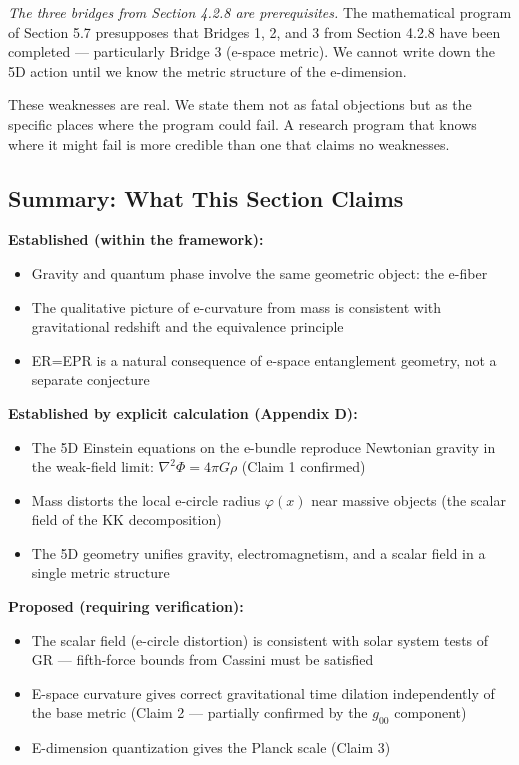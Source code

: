 \documentclass[aps,prd,preprint,superscriptaddress,longbibliography,floatfix]{revtex4-2}
\theoremstyle{remark}
\begin{document}
\textit{The three bridges from Section 4.2.8 are prerequisites.} The mathematical program of Section 5.7 presupposes that Bridges 1, 2, and 3 from Section 4.2.8 have been completed --- particularly Bridge 3 (e-space metric). We cannot write down the 5D action until we know the metric structure of the e-dimension.

These weaknesses are real. We state them not as fatal objections but as the specific places where the program could fail. A research program that knows where it might fail is more credible than one that claims no weaknesses.



\subsection{Summary: What This Section Claims}

\textbf{Established (within the framework):}

\begin{itemize}
  \item Gravity and quantum phase involve the same geometric object: the e-fiber
  \item The qualitative picture of e-curvature from mass is consistent with gravitational redshift and the equivalence principle
  \item ER=EPR is a natural consequence of e-space entanglement geometry, not a separate conjecture
\end{itemize}

\textbf{Established by explicit calculation (Appendix D):}

\begin{itemize}
  \item The 5D Einstein equations on the e-bundle reproduce Newtonian gravity in the weak-field limit: $\nabla^{2}\Phi = 4\pi G\rho$ (Claim 1 confirmed)
  \item Mass distorts the local e-circle radius $\varphi(x)$ near massive objects (the scalar field of the KK decomposition)
  \item The 5D geometry unifies gravity, electromagnetism, and a scalar field in a single metric structure
\end{itemize}

\textbf{Proposed (requiring verification):}

\begin{itemize}
  \item The scalar field (e-circle distortion) is consistent with solar system tests of GR --- fifth-force bounds from Cassini must be satisfied
  \item E-space curvature gives correct gravitational time dilation independently of the base metric (Claim 2 --- partially confirmed by the $g_{00}$ component)
  \item E-dimension quantization gives the Planck scale (Claim 3)
\end{itemize}
\end{document}
